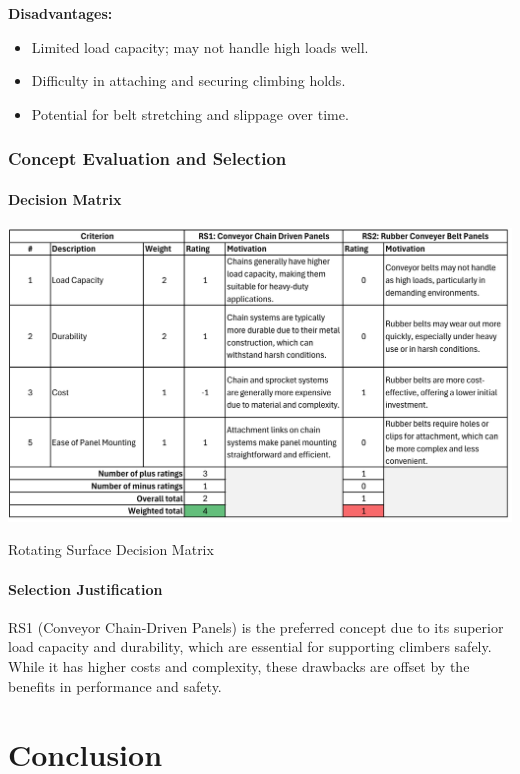 \textbf{Disadvantages:}
\begin{itemize}
    \item Limited load capacity; may not handle high loads well.
    \item Difficulty in attaching and securing climbing holds.
    \item Potential for belt stretching and slippage over time.
\end{itemize}

\subsubsection{Concept Evaluation and Selection}

\paragraph{Decision Matrix}

\begin{table}[H]
    \centering
    \includegraphics[width=1\linewidth]{tables/RS_dec_matrix.pdf}
    \caption{Rotating Surface Decision Matrix}
    \label{tab:rs_decision_matrix}
\end{table}

\paragraph{Selection Justification}

RS1 (Conveyor Chain-Driven Panels) is the preferred concept due to its superior load capacity and durability, which are essential for supporting climbers safely. While it has higher costs and complexity, these drawbacks are offset by the benefits in performance and safety.

\section{Conclusion}

